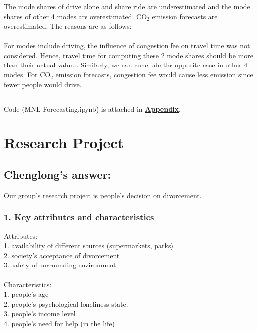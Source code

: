 \documentclass[11pt]{article}
\begin{document}
\subsubsection{} 
The mode shares of drive alone and share ride are underestimated and the mode shares of other 4 modes are overestimated. CO$_2$ emission forecasts are overestimated. The reasons are as follows:\\\\
For modes include driving, the influence of congestion fee on travel time was not considered. Hence, travel time for computing these 2 mode shares should be more than their actual values. Similarly, we can conclude the opposite case in other 4 modes. For CO$_2$ emission forecasts, congestion fee would cause less emission since fewer people would drive.
\subsection{}  
Code (MNL-Forecasting.ipynb) is attached in \hyperref[code]{\textbf{Appendix}}.
\newpage
\section{Research Project}
\subsection*{Chenglong's answer:}
Our group's research project is people's decision on divorcement.
\subsubsection*{1. Key attributes and characteristics}
Attributes:\\
1. availability of different sources (supermarkets, parks)\\
2. society's acceptance of divorcement\\
3. safety of surrounding environment\\\\
Characteristics:\\ 
1. people's age\\
2. people's psychological loneliness state.\\
3. people's income level\\
4. people's need for help (in the life)
\end{document}
